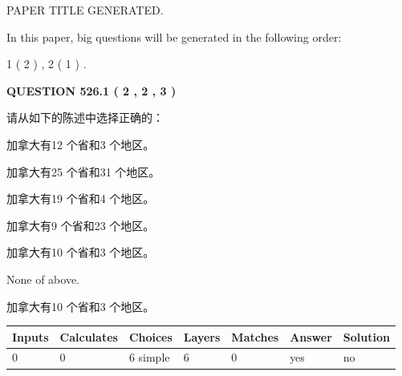 \documentclass{ctexart}
\begin{document}
   
 \vspace{0.2in}
 
 
 
 
   
   
 PAPER TITLE GENERATED.
   
   
   
\vspace{0.2in}
   
In this paper, big questions will be generated in the following order: 
   
   
   1 ( 2 )
 ,
   2 ( 1 )
 .
  
\vspace{0.2in}
  
{\textbf{\Large{QUESTION
526.1 
 ( 2 , 2 , 3 )
}}}
  
  
请从如下的陈述中选择正确的：
 
 
加拿大有12 个省和3 个地区。
 
 
加拿大有25 个省和31 个地区。
 
 
加拿大有19 个省和4 个地区。
 
 
加拿大有9 个省和23 个地区。
 
 
加拿大有10 个省和3 个地区。
 
 
 None of above.
 
 
\noindent{}
 
 
加拿大有10 个省和3 个地区。
 
 
\noindent{}
 
 
   
   
   
   
\noindent\begin{tabular}{|l|l|l|l|l|l|l|}
 \hline
Inputs & Calculates & Choices & Layers & Matches & Answer & Solution \\ \hline
 0  & 
 0  & 
 6
  simple  
  & 
 6  & 
 0  & 
  yes & 
  no 
  \\ \hline
 \end{tabular}
   
   
   
   
\noindent{}
   
\end{document}
